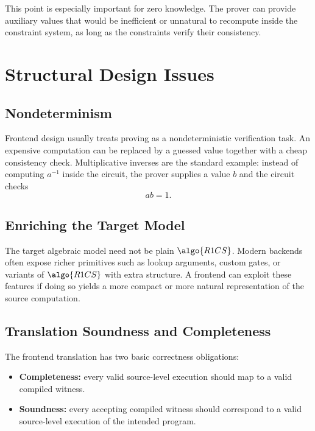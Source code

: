 \documentclass[11pt]{article}
\begin{document}
This point is especially important for zero knowledge.  The prover can provide
auxiliary values that would be inefficient or unnatural to recompute inside the
constraint system, as long as the constraints verify their consistency.

\section{Structural Design Issues}

\subsection{Nondeterminism}

Frontend design usually treats proving as a nondeterministic verification task.
An expensive computation can be replaced by a guessed value together with a
cheap consistency check.  Multiplicative inverses are the standard example:
instead of computing $a^{-1}$ inside the circuit, the prover supplies a value
$b$ and the circuit checks
\[
  ab = 1.
\]

\subsection{Enriching the Target Model}

The target algebraic model need not be plain $\algo{R1CS}$.  Modern backends
often expose richer primitives such as lookup arguments, custom gates, or
variants of $\algo{R1CS}$ with extra structure.  A frontend can exploit these
features if doing so yields a more compact or more natural representation of
the source computation.

\subsection{Translation Soundness and Completeness}

The frontend translation has two basic correctness obligations:
\begin{itemize}
  \item \textbf{Completeness:} every valid source-level execution should map to
        a valid compiled witness.
  \item \textbf{Soundness:} every accepting compiled witness should correspond
        to a valid source-level execution of the intended program.
\end{itemize}
\end{document}
